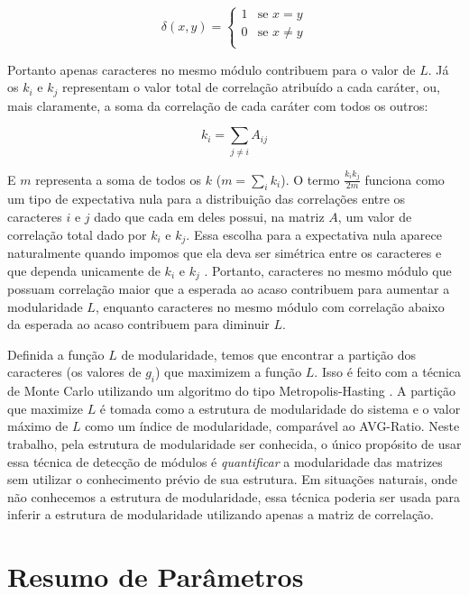 \begin{equation}
   \delta (x,y) = \left \{ 
      \begin{array}{rl}
          1 & \text{se } x = y\\
          0 & \text{se } x \neq y\\
      \end{array} \right.
\end{equation}

Portanto apenas caracteres no mesmo módulo contribuem para o valor de $L$.
Já os $k_i$ e $k_j$  representam o valor total de correlação atribuído a
cada caráter, ou, mais claramente, a soma da correlação de cada caráter com
todos os outros:

\begin{equation}
   k_i = \sum_{j \neq i} A_{ij}
\end{equation}

E $m$ representa a soma de todos os $k$ ($m=\sum_i k_i$).
O termo $\frac{k_ik_j}{2m}$ funciona como um tipo de expectativa nula
para a distribuição das correlações entre os caracteres $i$ e $j$ dado que
cada em deles possui, na matriz $A$, um valor de correlação total
dado por $k_i$ e $k_j$.
Essa escolha para a expectativa nula aparece naturalmente quando
impomos que ela deva ser simétrica entre os caracteres e que dependa
unicamente de $k_i$ e $k_j$ \citep[Para detalhes veja][]{Newman2006a}.
Portanto, caracteres no mesmo módulo que possuam correlação maior que a
esperada ao acaso contribuem para aumentar a modularidade $L$, enquanto
caracteres no mesmo módulo com correlação abaixo da esperada ao acaso
contribuem para diminuir $L$.

Definida a função $L$ de modularidade, temos que encontrar a partição
dos caracteres (os valores de $g_i$) que maximizem a função $L$.
Isso é feito com a técnica de Monte Carlo utilizando um algoritmo
do tipo Metropolis-Hasting \citep{Metropolis1953}.
A partição que maximize $L$ é tomada como a estrutura de modularidade do
sistema e o valor máximo de $L$ como um índice de modularidade,
comparável ao AVG-Ratio.
Neste trabalho, pela estrutura de modularidade ser conhecida, o único propósito 
de usar essa técnica de detecção de módulos é {\it quantificar} a 
modularidade das matrizes sem utilizar o conhecimento prévio de sua
estrutura.
Em situações naturais, onde não conhecemos a estrutura de modularidade,
essa técnica poderia ser usada para inferir a estrutura de modularidade
utilizando apenas a matriz de correlação.

\section{Resumo de Parâmetros}

